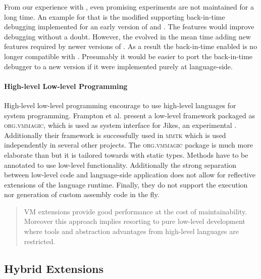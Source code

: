 From our experience with \PH, even promising \VM experiments are not maintained for a long time.
An example for that is the modified \VM supporting back-in-time debugging implemented for an early version of \PH and \Squeak \cite{Lien08b}.
The features would improve debugging without a doubt.
However, the \VM evolved in the mean time adding new features required by newer versions of \PH.
As a result the back-in-time enabled \VM is no longer compatible with \PH.
Presumably it would be easier to port the back-in-time debugger to a new \PH version if it were implemented purely at language-side.


\paragraph{High-level Low-level Programming}
High-level low-level programming \cite{Fram09a} encourage to use high-level languages for system programming.
Frampton et al. present a low-level framework packaged as \textsc{org.vmmagic}, which is used as system interface for Jikes, an experimental \Java \VM.
Additionally their framework is successfully used in \textsc{mmtk} \cite{Blac04a} which is used independently in several other projects.
The \textsc{org.vmmagic} package is much more elaborate than \B but it is tailored towards \Java with static types.
Methods have to be annotated to use low-level functionality.
Additionally the strong separation between low-level code and language-side application does not allow for reflective extensions of the language runtime.
Finally, they do not support the execution nor generation of custom assembly code in the fly.



\begin{quote}
VM extensions provide good performance at the cost of maintainability. 
Moreover this approach implies resorting to pure low-level development where tools and abstraction advantages from high-level languages are restricted.
\end{quote}

\subsection{Hybrid Extensions}

